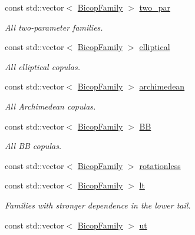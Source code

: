 \begin{DoxyCompactItemize}
const std\+::vector$<$ \hyperlink{namespacevinecopulib_a42e95cc06d33896199caab0c11ad44f3}{Bicop\+Family} $>$ \hyperlink{namespacevinecopulib_1_1bicop__families_ad5871c39b4ee62bd44fa851d7d70c7ca}{two\+\_\+par}
\begin{DoxyCompactList}\small\item\em All two-\/parameter families. \end{DoxyCompactList}\item 
const std\+::vector$<$ \hyperlink{namespacevinecopulib_a42e95cc06d33896199caab0c11ad44f3}{Bicop\+Family} $>$ \hyperlink{namespacevinecopulib_1_1bicop__families_a24b790671c9f4b25e57ecbc3505232fb}{elliptical}
\begin{DoxyCompactList}\small\item\em All elliptical copulas. \end{DoxyCompactList}\item 
const std\+::vector$<$ \hyperlink{namespacevinecopulib_a42e95cc06d33896199caab0c11ad44f3}{Bicop\+Family} $>$ \hyperlink{namespacevinecopulib_1_1bicop__families_a714863b69ae59ac48c7fb2be45cd2619}{archimedean}
\begin{DoxyCompactList}\small\item\em All Archimedean copulas. \end{DoxyCompactList}\item 
const std\+::vector$<$ \hyperlink{namespacevinecopulib_a42e95cc06d33896199caab0c11ad44f3}{Bicop\+Family} $>$ \hyperlink{namespacevinecopulib_1_1bicop__families_aea9f7383b4bbbe47d4862f25e6bb8ad8}{BB}
\begin{DoxyCompactList}\small\item\em All BB copulas. \end{DoxyCompactList}\item 
const std\+::vector$<$ \hyperlink{namespacevinecopulib_a42e95cc06d33896199caab0c11ad44f3}{Bicop\+Family} $>$ \hyperlink{namespacevinecopulib_1_1bicop__families_ac221bc84c32d2836692ed40d89439928}{rotationless}
\item 
const std\+::vector$<$ \hyperlink{namespacevinecopulib_a42e95cc06d33896199caab0c11ad44f3}{Bicop\+Family} $>$ \hyperlink{namespacevinecopulib_1_1bicop__families_a5a5f349f07638768ff8b1bb2ae90d102}{lt}
\begin{DoxyCompactList}\small\item\em Families with stronger dependence in the lower tail. \end{DoxyCompactList}\item 
const std\+::vector$<$ \hyperlink{namespacevinecopulib_a42e95cc06d33896199caab0c11ad44f3}{Bicop\+Family} $>$ \hyperlink{namespacevinecopulib_1_1bicop__families_af754a2d2697709c204dda0473215f9cd}{ut}

\end{DoxyCompactItemize}
